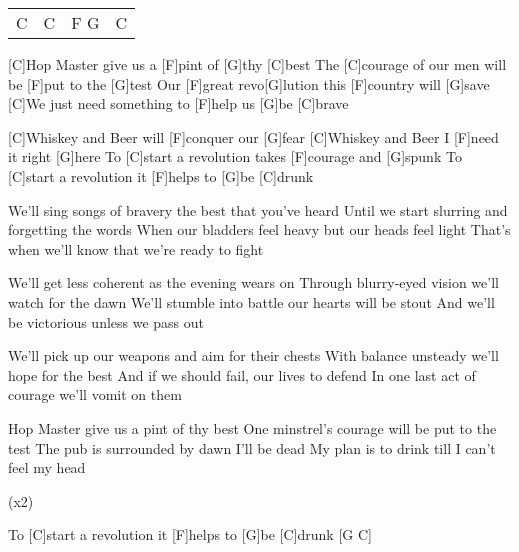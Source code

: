 

\begin{guitar}
	{\footnotesize\begin{tabular}{l|l|l|l}
			C & C & F G & C
	\end{tabular}}

	[C]Hop Master give us a [F]pint of [G]thy [C]best
	The [C]courage of our men will be [F]put to the [G]test
	Our [F]great revo[G]lution this [F]country will [G]save
	[C]We just need something to [F]help us [G]be [C]brave
	
	[C]Whiskey and Beer will [F]conquer our [G]fear
	[C]Whiskey and Beer I [F]need it right [G]here
	To [C]start a revolution takes [F]courage and [G]spunk
	To [C]start a revolution it [F]helps to [G]be [C]drunk
	
	We'll sing songs of bravery the best that you've heard
	Until we start slurring and forgetting the words
	When our bladders feel heavy but our heads feel light
	That's when we'll know that we're ready to fight
	
	 
	
	We'll get less coherent as the evening wears on
	Through blurry-eyed vision we'll watch for the dawn
	We'll stumble into battle our hearts will be stout
	And we'll be victorious unless we pass out
	
	 
	
	We'll pick up our weapons and aim for their chests
	With balance unsteady we'll hope for the best
	And if we should fail, our lives to defend
	In one last act of courage we'll vomit on them
	
	 
	
	Hop Master give us a pint of thy best
	One minstrel's courage will be put to the test
	The pub is surrounded by dawn I'll be dead
	My plan is to drink till I can't feel my head
	
	  (x2)
	
	To [C]start a revolution it [F]helps to [G]be [C]drunk [G C]{}
\end{guitar}